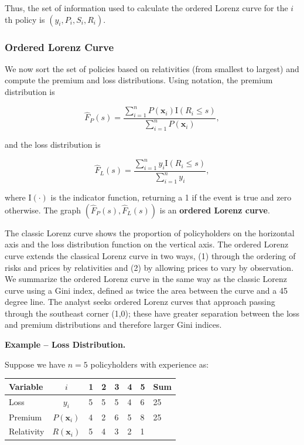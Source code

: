 \documentclass[]{book}
\theoremstyle{definition}
\theoremstyle{definition}
\theoremstyle{definition}
\theoremstyle{remark}
\begin{document}
Thus, the set of information used to calculate the ordered Lorenz curve
for the \(i\)th policy is \((y_i, P_i, S_i, R_i)\).

\subsubsection*{Ordered Lorenz Curve}\label{ordered-lorenz-curve}

We now sort the set of policies based on relativities (from smallest to
largest) and compute the premium and loss distributions. Using notation,
the premium distribution is

\begin{equation}
\hat{F}_P(s) =  \frac{ \sum_{i=1}^n
P(\mathbf{x}_i) \mathrm{I}(R_i \leq s) }{\sum_{i=1}^n P(\mathbf{x}_i)} ,\label{eq:EmpPremDF}
\end{equation}

and the loss distribution is

\begin{equation}
\hat{F}_{L}(s) =  \frac{ \sum_{i=1}^n y_i \mathrm{I}(R_i
\leq s) }{\sum_{i=1}^n y_i} ,\label{eq:EmpLossDF}
\end{equation}

where \(\mathrm{I}(\cdot)\) is the indicator function, returning a 1 if
the event is true and zero otherwise. The graph
\(\left(\hat{F}_P(s),\hat{F}_{L}(s) \right)\) is an \textbf{ordered
Lorenz curve}.

The classic Lorenz curve shows the proportion of policyholders on the
horizontal axis and the loss distribution function on the vertical axis.
The ordered Lorenz curve extends the classical Lorenz curve in two ways,
(1) through the ordering of risks and prices by relativities and (2) by
allowing prices to vary by observation. We summarize the ordered Lorenz
curve in the same way as the classic Lorenz curve using a Gini index,
defined as twice the area between the curve and a 45 degree line. The
analyst seeks ordered Lorenz curves that approach passing through the
southeast corner (1,0); these have greater separation between the loss
and premium distributions and therefore larger Gini indices.

\textbf{Example -- Loss Distribution.}

Suppose we have \(n=5\) policyholders with experience as:

\begin{longtable}[]{@{}lcllllll@{}}
\toprule
Variable & \(i\) & 1 & 2 & 3 & 4 & 5 & Sum\tabularnewline
\midrule
\endhead
Loss & \(y_i\) & 5 & 5 & 5 & 4 & 6 & 25\tabularnewline
Premium & \(P(\mathbf{x}_i)\) & 4 & 2 & 6 & 5 & 8 & 25\tabularnewline
Relativity & \(R(\mathbf{x}_i)\) & 5 & 4 & 3 & 2 & 1 &\tabularnewline
\bottomrule
\end{longtable}
\end{document}
